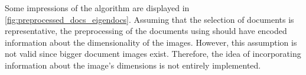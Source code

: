 Some impressions of the \eigendocs{} algorithm are displayed in \autoref{fig:preprocessed_docs_eigendocs}.
Assuming that the selection of documents is representative, 
the preprocessing of the documents using \eigendocs{} should have encoded information about the dimensionality of the images.
However, this assumption is not valid since bigger document images exist.
Therefore, the idea of incorporating information about the image's dimensions is not entirely implemented.
